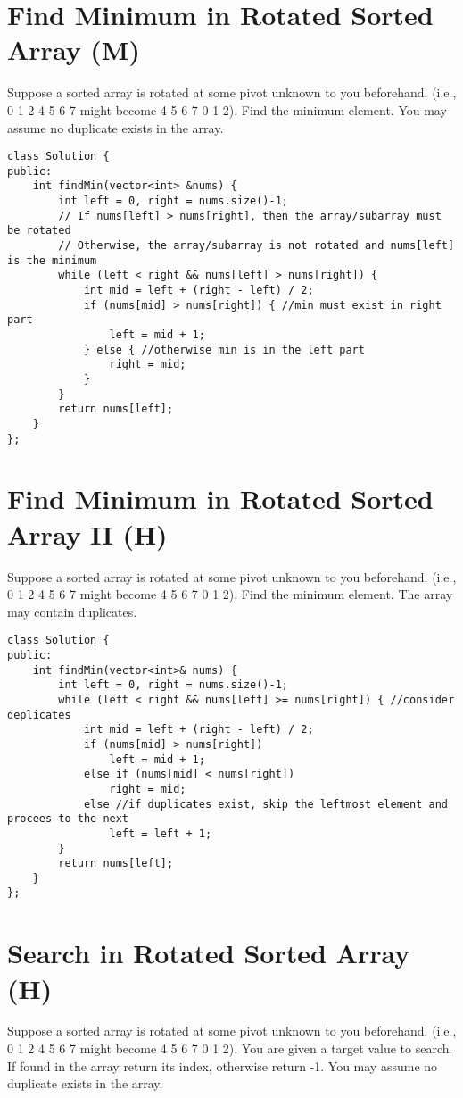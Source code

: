 \section{Find Minimum in Rotated Sorted Array (M)}
Suppose a sorted array is rotated at some pivot unknown to you beforehand.
(i.e., 0 1 2 4 5 6 7 might become 4 5 6 7 0 1 2).
Find the minimum element.
You may assume no duplicate exists in the array.\\

\begin{lstlisting}
class Solution {
public:
    int findMin(vector<int> &nums) {
        int left = 0, right = nums.size()-1;
        // If nums[left] > nums[right], then the array/subarray must be rotated 
        // Otherwise, the array/subarray is not rotated and nums[left] is the minimum
        while (left < right && nums[left] > nums[right]) {
            int mid = left + (right - left) / 2;
            if (nums[mid] > nums[right]) { //min must exist in right part
                left = mid + 1;
            } else { //otherwise min is in the left part
                right = mid;
            }
        }
        return nums[left];
    }
};
\end{lstlisting}


\section{Find Minimum in Rotated Sorted Array II (H)}
Suppose a sorted array is rotated at some pivot unknown to you beforehand.
(i.e., 0 1 2 4 5 6 7 might become 4 5 6 7 0 1 2).
Find the minimum element.
The array may contain duplicates.\\

\begin{lstlisting}
class Solution {
public:
    int findMin(vector<int>& nums) {
        int left = 0, right = nums.size()-1;
        while (left < right && nums[left] >= nums[right]) { //consider deplicates
            int mid = left + (right - left) / 2;
            if (nums[mid] > nums[right])
                left = mid + 1;
            else if (nums[mid] < nums[right])
                right = mid;
            else //if duplicates exist, skip the leftmost element and procees to the next
                left = left + 1;
        }
        return nums[left];
    }
};
\end{lstlisting}


\section{Search in Rotated Sorted Array (H)}
Suppose a sorted array is rotated at some pivot unknown to you beforehand.
(i.e., 0 1 2 4 5 6 7 might become 4 5 6 7 0 1 2).
You are given a target value to search. If found in the array return its index, otherwise return -1.
You may assume no duplicate exists in the array.\\

